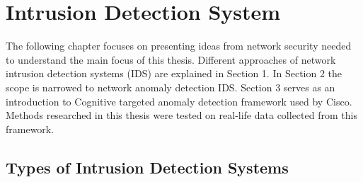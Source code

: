 \documentclass[thesis=B,english]{FITthesis}[2012/10/20]
\begin{document}


\chapter{Intrusion Detection System}

The following chapter focuses on presenting ideas from network security needed to understand the main focus of this thesis.
Different approaches of network intrusion detection systems (IDS) are explained in Section 1.
In Section 2 the scope is narrowed to network anomaly detection IDS.
Section 3 serves as an introduction to Cognitive targeted anomaly detection framework used by Cisco.
Methods researched in this thesis were tested on real-life data collected from this framework. \\ 

\section{Types of Intrusion Detection Systems}
\end{document}
